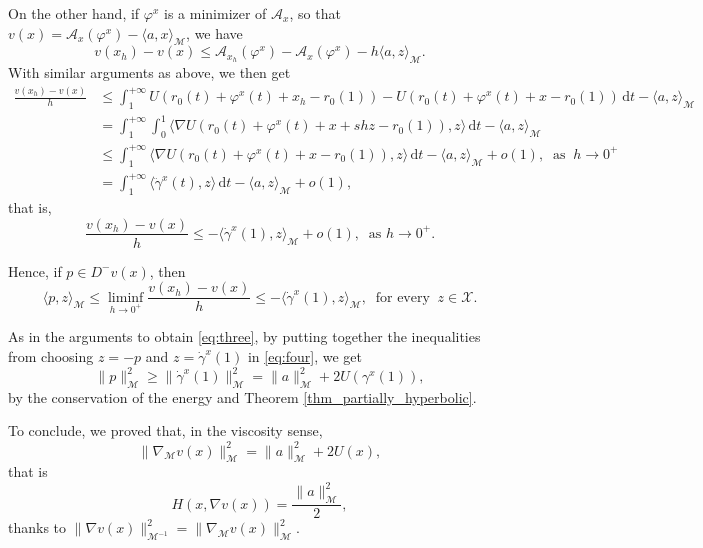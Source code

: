 \documentclass[a4paper,10pt]{amsart}
\newcommand{\ud}{\mathrm{d}}
\theoremstyle{plain}
\theoremstyle{definition}
\numberwithin{equation}{section}
\numberwithin{thm}{section}
\begin{document}
\smallskip
On the other hand, if $\varphi^x$ is a minimizer of $\mathcal{A}_x$, so that $v(x)=\mathcal{A}_x(\varphi^x)-\langle a,x \rangle_\mathcal{M}$, we have
\[
v(x_h)-v(x) \le \mathcal{A}_{x_h}(\varphi^x)-\mathcal{A}_x(\varphi^x) - h\langle a, z\rangle_\mathcal{M}.
\]
With similar arguments as above, we then get
\[
\begin{split} 
\frac{v(x_h)-v(x)}{h} & \le \int_{1}^{+\infty}  U(r_0(t)+\varphi^x(t)+x_h -r_0(1))-U(r_0(t)+\varphi^x(t)+x-r_0(1))\, \ud t -\langle a,z\rangle_\mathcal{M}
\\
&=\int_{1}^{+\infty} \int_0^1 \langle \nabla U(r_0(t)+ \varphi^x(t) + x+shz-r_0(1)),z\rangle\, \ud t -\langle a, z\rangle_\mathcal{M} 
\\
& \le \int_{1}^{+\infty} \langle\nabla U(r_0(t)+ \varphi^x(t)+x-r_0(1)),z\rangle\, \ud t - \langle a, z\rangle_\mathcal{M} +o(1), \ \mbox{ as } \ h \to 0^+
\\
&= \int_{1}^{+\infty} \langle \ddot \gamma^x(t), z\rangle \, \ud t -\langle a,z\rangle_\mathcal{M} +o(1),
\end{split}
\]
that is,
\begin{equation}
    \label{eq:diff_v_2}
    \frac{v(x_h)-v(x)}{h} \le -\langle \dot \gamma^x(1), z\rangle_\mathcal{M} + o(1),\ \mbox{ as }h\to0^+.
\end{equation}

Hence, if $p \in D^-v(x)$, then
\begin{equation}
    \label{eq:four}
\langle p, z\rangle_\mathcal{M} \le \liminf_{h \to 0^+} \frac{v(x_h)-v(x)}{h} \le  -\langle \dot \gamma^x(1), z\rangle_\mathcal{M}, \ \mbox{ for every } \ z \in \mathcal{X}.
\end{equation}

As in the arguments to obtain \eqref{eq:three}, by putting together the inequalities from choosing $z=-p$ and $z=\dot \gamma^x(1)$ in \eqref{eq:four}, we get
\[
\|p\|_\mathcal{M}^2\ge \|\dot\gamma^x(1)\|_\mathcal{M}^2= \|a\|_\mathcal{M}^2+2U(\gamma^x(1)),
\]
by the conservation of the energy and Theorem \ref{thm_partially_hyperbolic}.

\smallskip
To conclude, we proved that, in the viscosity sense,
\[
\|\nabla_{\mathcal M} v(x)\|_\mathcal{M}^2 = \|a\|_\mathcal{M}^2+2U(x),
\]
that is
\begin{equation}
\label{eq:HJ-v}
H(x,\nabla v(x)) = \frac{\|a\|_\mathcal{M}^2}{2},
\end{equation}
thanks to $\|\nabla v(x)\|_{\mathcal M^{-1}}^2=
\|\nabla_{\mathcal M} v(x)\|_\mathcal{M}^2$.
\end{document}
